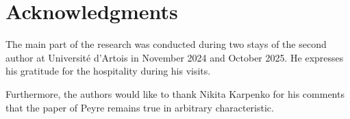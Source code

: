 \documentclass{amsart}
\numberwithin{equation}{section}
\begin{document}
\section*{Acknowledgments}

The main part of the research was conducted during two stays of the second author at Universit\'e d'Artois in November 2024 and October 2025.
He expresses his gratitude for the hospitality during his visits.

Furthermore, the authors would like to thank Nikita Karpenko for his comments that the paper of Peyre \cite[Theorem 4.1]{PeyreProductsSeveriBrauer} remains true in arbitrary characteristic.




\end{document}
